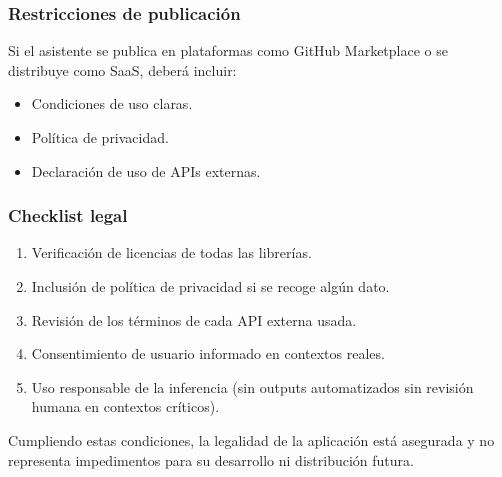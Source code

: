 \subsubsection{Restricciones de publicación}

Si el asistente se publica en plataformas como GitHub Marketplace o se distribuye como SaaS, deberá incluir:

\begin{itemize}
	\item Condiciones de uso claras.
	\item Política de privacidad.
	\item Declaración de uso de APIs externas.
\end{itemize}

\subsubsection{Checklist legal}

\begin{enumerate}
	\item Verificación de licencias de todas las librerías.
	\item Inclusión de política de privacidad si se recoge algún dato.
	\item Revisión de los términos de cada API externa usada.
	\item Consentimiento de usuario informado en contextos reales.
	\item Uso responsable de la inferencia (sin outputs automatizados sin revisión humana en contextos críticos).
\end{enumerate}

Cumpliendo estas condiciones, la legalidad de la aplicación está asegurada y no representa impedimentos para su desarrollo ni distribución futura.